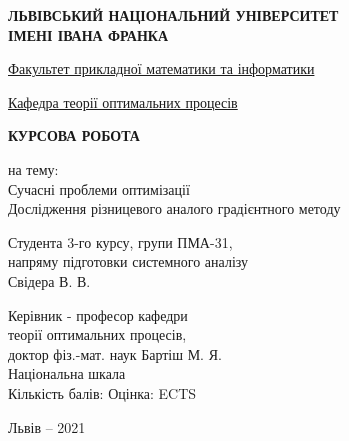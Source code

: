 \documentclass[14pt]{article}
\begin{document}
\begin{titlepage}


\begin{center}
\large
\textbf{ЛЬВІВСЬКИЙ НАЦІОНАЛЬНИЙ УНІВЕРСИТЕТ \\
ІМЕНІ ІВАНА ФРАНКА}
\end{center}

\begin{center}
\Large
\underline{
Факультет прикладної математики та інформатики
}
\end{center}

\begin{center}
\normalsize
\underline{
Кафедра теорії оптимальних процесів
}
\end{center}

\bigskip
\bigskip
\bigskip
\bigskip
\bigskip

\begin{center}
\huge
\textbf{
КУРСОВА РОБОТА}
\end{center}
\bigskip

\begin{center}
\large %
на тему:
\\
% 
Сучасні проблеми оптимізації\\
Дослідження різницевого аналого градієнтного методу

\end{center}
\bigskip
\bigskip
\bigskip\bigskip
\bigskip
\bigskip\bigskip
\bigskip
\bigskip\bigskip
\bigskip
\bigskip\bigskip
\bigskip
\bigskip\bigskip
\bigskip
\bigskip\bigskip
\bigskip
\bigskip\bigskip
\bigskip



\hfill\begin{minipage}{0.7\linewidth}
\begin{flushleft}
\large 	
Студента 3-го курсу, групи ПМА-31,\\
напряму підготовки системного аналізу\\
Свідера В. В.\\
\medskip

Керівник - професор кафедри\\
теорії оптимальних процесів,\\ доктор фіз.-мат. наук Бартіш М. Я.\\ 						

\medskip
Національна шкала \underline{\hspace{3cm}}\\
Кількість балів: \underline{\hspace{1cm}} Оцінка: ECTS \underline{\hspace{1cm}}

\end{flushleft}
\end{minipage}

\bigskip
\bigskip


\begin{center} 
\large 
Львів – 2021
\end{center}



\end{titlepage}

\clearpage


\end{document}
